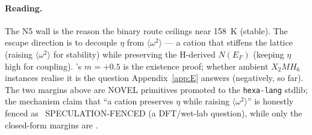 \paragraph{Reading.}
The N5 wall is the reason the binary route ceilings near \SI{158}{\kelvin}
(stable). The escape direction is to decouple $\eta$ from
$\langle\omega^2\rangle$ --- a cation that stiffens the lattice (raising
$\langle\omega^2\rangle$ for stability) while preserving the H-derived
$N(E_F)$ (keeping $\eta$ high for coupling). 's $m = +0.5$ is the
existence proof; whether ambient $X_2MH_6$ instances realise it is the
question Appendix~\ref{app:E} answers (negatively, so far). The two margins
above are NOVEL primitives promoted to the \texttt{hexa-lang} stdlib; the
mechanism claim that ``a cation preserves $\eta$ while raising
$\langle\omega^2\rangle$'' is honestly fenced as \tierWhite\
SPECULATION-FENCED (a DFT/wet-lab question), while only the closed-form
margins are \tierGreen.
